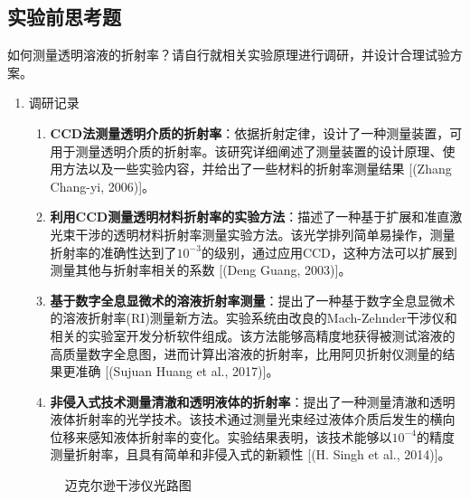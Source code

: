 \documentclass[dvipsnames, svgnames,a4paper,11pt]{article}
\begin{document}
	
	
	
	\subsection{实验前思考题}
	
	\begin{question}
		如何测量透明溶液的折射率？请自行就相关实验原理进行调研，并设计合理试验方案。
	\end{question}
	\begin{enumerate}
		\item 调研记录
		\begin{enumerate}
			\item \textbf{CCD法测量透明介质的折射率}：依据折射定律，设计了一种测量装置，可用于测量透明介质的折射率。该研究详细阐述了测量装置的设计原理、使用方法以及一些实验内容，并给出了一些材料的折射率测量结果 [(Zhang Chang-yi, 2006)]。
			
			\item \textbf{利用CCD测量透明材料折射率的实验方法}：描述了一种基于扩展和准直激光束干涉的透明材料折射率测量实验方法。该光学排列简单易操作，测量折射率的准确性达到了$10^{-3}$的级别，通过应用CCD，这种方法可以扩展到测量其他与折射率相关的系数 [(Deng Guang, 2003)]。
			
			\item \textbf{基于数字全息显微术的溶液折射率测量}：提出了一种基于数字全息显微术的溶液折射率(RI)测量新方法。实验系统由改良的Mach-Zehnder干涉仪和相关的实验室开发分析软件组成。该方法能够高精度地获得被测试溶液的高质量数字全息图，进而计算出溶液的折射率，比用阿贝折射仪测量的结果更准确 [(Sujuan Huang et al., 2017)]。
			
			\item \textbf{非侵入式技术测量清澈和透明液体的折射率}：提出了一种测量清澈和透明液体折射率的光学技术。该技术通过测量光束经过液体介质后发生的横向位移来感知液体折射率的变化。实验结果表明，该技术能够以$10^{-4}$的精度测量折射率，且具有简单和非侵入式的新颖性 [(H. Singh et al., 2014)]。
			
		\end{enumerate}
		
		\begin{figure}[htbp]
			\centering
			\caption{迈克尔逊干涉仪光路图}
			\label{fig:fig2}			
		\end{figure}
		

\end{enumerate}
\end{document}

